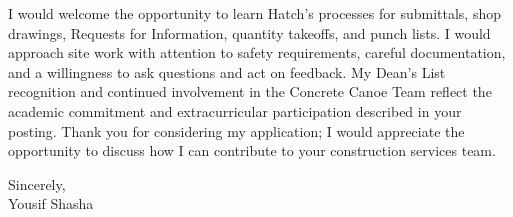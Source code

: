 \documentclass[11pt,letterpaper]{article}
\begin{document}
I would welcome the opportunity to learn Hatch's processes for submittals, shop drawings, Requests for Information, quantity takeoffs, and punch lists. I would approach site work with attention to safety requirements, careful documentation, and a willingness to ask questions and act on feedback. My Dean's List recognition and continued involvement in the Concrete Canoe Team reflect the academic commitment and extracurricular participation described in your posting. Thank you for considering my application; I would appreciate the opportunity to discuss how I can contribute to your construction services team.

Sincerely,\\
Yousif Shasha
\end{document}
